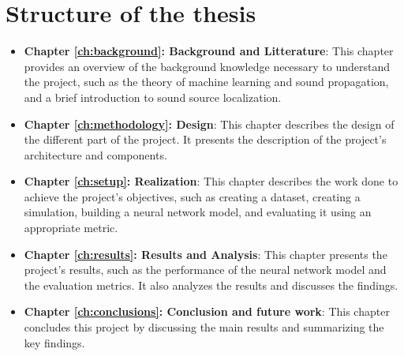 \section{Structure of the thesis}


\begin{itemize}
    \item \textbf{Chapter \ref{ch:background}: Background and Litterature}: This chapter provides an overview of the background knowledge necessary to understand the project, such as the theory of machine learning and sound propagation, and a brief introduction to sound source localization.
    \item \textbf{Chapter \ref{ch:methodology}: Design}: This chapter describes the design of the different part of the project. It presents the description of the project's architecture and components.
    \item \textbf{Chapter \ref{ch:setup}: Realization}: This chapter describes the work done to achieve the project's objectives, such as creating a dataset, creating a simulation, building a neural network model, and evaluating it using an appropriate metric.
    \item \textbf{Chapter \ref{ch:results}: Results and Analysis}: This chapter presents the project's results, such as the performance of the neural network model and the evaluation metrics. It also analyzes the results and discusses the findings.
    \item \textbf{Chapter \ref{ch:conclusions}: Conclusion and future work}: This chapter concludes this project by discussing the main results and summarizing the key findings. 
\end{itemize}
